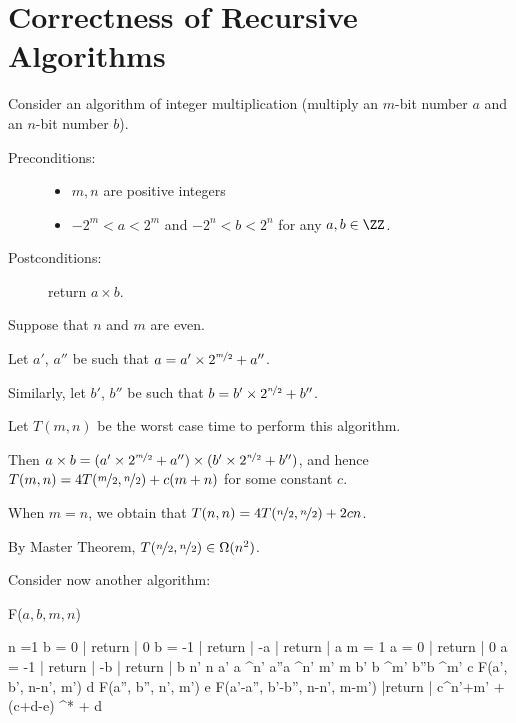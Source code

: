 \documentclass[11pt]{scrartcl}
\begin{document}
\section{Correctness of Recursive Algorithms}

Consider an algorithm of integer multiplication (multiply an $m$-bit number $a$ and an $n$-bit number $b$).

\begin{description}

\item[Preconditions:] 
\hfill

\begin{itemize}
\item $m, n$ are positive integers
\item $-2^m < a < 2^{m}$ and $-2^n < b < 2^n$ for any $a, b\in\ZZ$.
\end{itemize}
\item[Postconditions:] return $a\times b$.
\end{description}

Suppose that $n$ and $m$ are even.

Let $a'$, $a''$ be such that
$a = a' \times 2^{\nicefrac{m}{2}} + a''$.

Similarly, let $b'$, $b''$ be such that
$b = b' \times 2^{\nicefrac{n}{2}} + b''$.

Let $T(m, n)$ be the worst case time to perform this algorithm.

Then
$a\times b = ( a' \times 2^{\nicefrac{m}{2}} + a'') \times (b' \times
2^{\nicefrac{n}{2}} + b'')$, and hence
$T(m, n) = 4T(\nicefrac{m}{2}, \nicefrac{n}{2}) + c(m+n)$ for some
constant $c$.

When $m=n$, we obtain that $T(n, n) = 4T(\nicefrac{n}{2}, \nicefrac{n}{2}) + 2c n$.

By Master Theorem, $T(\nicefrac{n}{2}, \nicefrac{n}{2}) \in \Omega (n^2)$.

Consider now another algorithm:

F($a, b, m, n$)

\begin{program}
\IF n =1
\THEN \IF b = 0 \THEN | return | 0 
\ELIF b = -1 \THEN | return | -a
\ELSE | return | a 
\FI
\FI
\IF m = 1
\THEN \IF a = 0 \THEN | return | 0
\ELIF a = -1 \THEN | return | -b
\ELSE | return | b
\FI
\FI
n' \gets n 
a' \gets a ^{n'}
a''\gets a ^{n'}
m' \gets m 
b' \gets b ^{m'}
b''\gets b ^{m'}
c \gets F(a', b', n-n', m')
d \gets F(a'', b'', n', m')
e \gets F(a'-a'', b'-b'', n-n', m-m')
|return | c^{n'+m'} + (c+d-e) ^{*} + d
\end{program}
\end{document}
